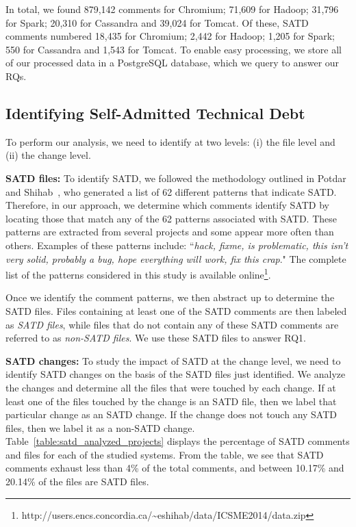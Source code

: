 In total, we found 879,142 comments for Chromium; 71,609 for Hadoop; 31,796 for Spark; 20,310 for Cassandra and 39,024 for Tomcat. Of these, SATD comments numbered 18,435 for Chromium; 2,442 for Hadoop; 1,205 for Spark; 550 for Cassandra and 1,543 for Tomcat. To enable easy processing, we store all of our processed data in a PostgreSQL database, which we query to answer our RQs.


\subsection{Identifying Self-Admitted Technical Debt}
\label{td}
To perform our analysis, we need to identify \SATD at two levels: (i) the file level and (ii) the change level.



\noindent\textbf{SATD files:} To identify SATD, we followed the methodology outlined in Potdar and Shihab~\cite{ICSM_PotdarS14}, who generated a list of 62 different patterns that indicate SATD. Therefore, in our approach, we determine which comments identify SATD by locating those that match any of the 62 patterns associated with SATD. These patterns are extracted from several projects and some appear more often than others. Examples of these patterns include: ``\textit{hack, fixme, is problematic, this isn't very solid, probably a bug, hope everything will work, fix this crap}." The complete list of the patterns considered in this study is available online\footnote{http://users.encs.concordia.ca/\textasciitilde eshihab/data/ICSME2014/data.zip}.

Once we identify the comment patterns, we then abstract up to determine the SATD files. Files containing at least one of the SATD comments are then labeled as {\em SATD files}, while files that do not contain any of these SATD comments are referred to as {\em non-SATD files}. We use these SATD files to answer RQ1.

\noindent\textbf{SATD changes:}
To study the impact of SATD at the change level, we need to identify SATD changes on the basis of the SATD files just identified. We analyze the changes and determine all the files that were touched by each change. If at least one of the files touched by the change is an SATD file, then we label that particular change as an SATD change. If the change does not touch any SATD files, then we label it as a non-SATD change. Table~\ref{table:satd_analyzed_projects} displays the percentage of SATD comments and files for each of the studied systems. From the table, we see that SATD comments exhaust less than 4\% of the total comments, and between 10.17\% and 20.14\% of the files are SATD files.

